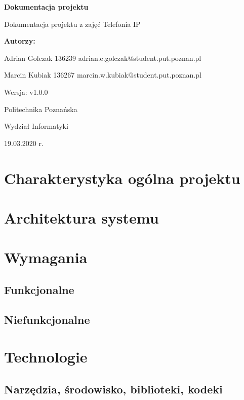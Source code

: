 \documentclass{article}
\newcommand{\version}{v1.0.0}
\begin{document}
\begin{titlepage}
		\begin{center}
		
			\huge
			\textbf{Dokumentacja projektu}
			
			\vspace{0.5cm}
			
			\large
			Dokumentacja projektu z zajęć Telefonia IP
			
			\vspace{2.4cm}
			
			\LARGE
			\textbf{Autorzy:}
			
			\vspace{0.3cm}
			
			Adrian Golczak 136239
			adrian.e.golczak@student.put.poznan.pl
			
			\vspace{0.3cm}
			
			Marcin Kubiak 136267
			marcin.w.kubiak@student.put.poznan.pl
			
			\vfill
			
			\normalsize
			Wersja: \version
			
			\vspace{2cm}
			
			\LARGE
			Politechnika Poznańska
					
			\vspace{0.3cm}
			
			\large
			Wydział Informatyki
			
			\vspace{0.6cm}
			
			19.03.2020 r.
			
		\end{center}
\end{titlepage}
\tableofcontents
\newpage
\section{Charakterystyka ogólna projektu}

\section{Architektura systemu}

\section{Wymagania}
\subsection{Funkcjonalne}

\subsection{Niefunkcjonalne}

\section{Technologie}
\subsection{Narzędzia, środowisko, biblioteki, kodeki}

\end{document}
